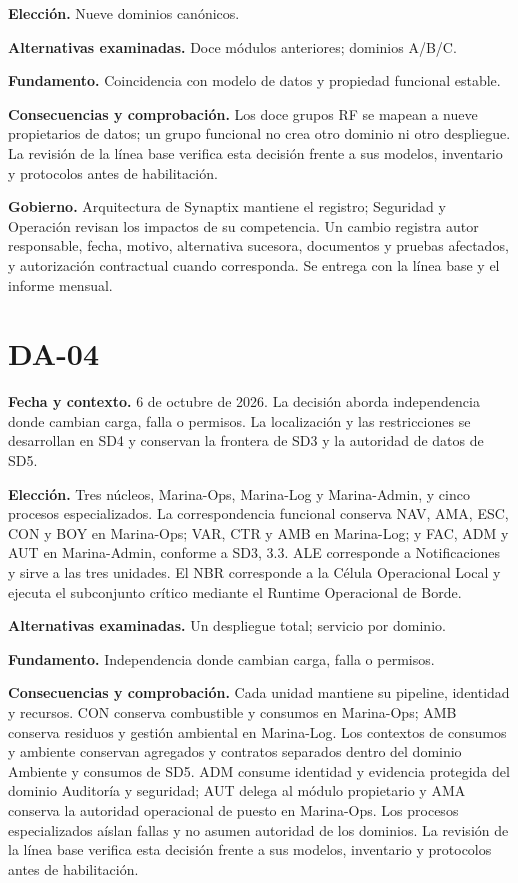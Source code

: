 \documentclass[11pt,letterpaper]{report}
\begin{document}
\textbf{Elección.} Nueve dominios canónicos.

\textbf{Alternativas examinadas.} Doce módulos anteriores; dominios A/B/C.

\textbf{Fundamento.} Coincidencia con modelo de datos y propiedad funcional estable.

\textbf{Consecuencias y comprobación.} Los doce grupos RF se mapean a nueve propietarios de datos; un grupo funcional no crea otro dominio ni otro despliegue. La revisión de la línea base verifica esta decisión frente a sus modelos, inventario y protocolos antes de habilitación.

\textbf{Gobierno.} Arquitectura de Synaptix mantiene el registro; Seguridad y Operación revisan los impactos de su competencia. Un cambio registra autor responsable, fecha, motivo, alternativa sucesora, documentos y pruebas afectados, y autorización contractual cuando corresponda. Se entrega con la línea base y el informe mensual.

\section*{DA-04}

\textbf{Fecha y contexto.} 6 de octubre de 2026. La decisión aborda independencia donde cambian carga, falla o permisos. La localización y las restricciones se desarrollan en SD4 y conservan la frontera de SD3 y la autoridad de datos de SD5.

\textbf{Elección.} Tres núcleos, Marina-Ops, Marina-Log y Marina-Admin, y cinco procesos especializados. La correspondencia funcional conserva NAV, AMA, ESC, CON y BOY en Marina-Ops; VAR, CTR y AMB en Marina-Log; y FAC, ADM y AUT en Marina-Admin, conforme a SD3, 3.3. ALE corresponde a Notificaciones y sirve a las tres unidades. El NBR corresponde a la Célula Operacional Local y ejecuta el subconjunto crítico mediante el Runtime Operacional de Borde.

\textbf{Alternativas examinadas.} Un despliegue total; servicio por dominio.

\textbf{Fundamento.} Independencia donde cambian carga, falla o permisos.

\textbf{Consecuencias y comprobación.} Cada unidad mantiene su pipeline, identidad y recursos. CON conserva combustible y consumos en Marina-Ops; AMB conserva residuos y gestión ambiental en Marina-Log. Los contextos de consumos y ambiente conservan agregados y contratos separados dentro del dominio Ambiente y consumos de SD5. ADM consume identidad y evidencia protegida del dominio Auditoría y seguridad; AUT delega al módulo propietario y AMA conserva la autoridad operacional de puesto en Marina-Ops. Los procesos especializados aíslan fallas y no asumen autoridad de los dominios. La revisión de la línea base verifica esta decisión frente a sus modelos, inventario y protocolos antes de habilitación.
\end{document}
